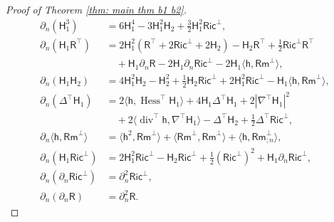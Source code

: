 \documentclass[11pt]{amsart}
\newcommand{\dvg}{\operatorname{div}}
\theoremstyle{definition}
\numberwithin{equation}{section}
\begin{document}
\begin{proof}[Proof of Theorem \ref{thm: main thm b1 b2}]
\begin{align*}
 \partial_n(\mathsf H_1^3)
 &=6\mathsf H_1^4-3\mathsf H_1^2\mathsf H_2
   +\frac32\mathsf H_1^2\mathsf{Ric}^\bot,\\[2mm]
 \partial_n(\mathsf H_1\mathsf R^\top)
 &=2\mathsf H_1^2(\mathsf R^\top+2\mathsf{Ric}^\bot+2\mathsf H_2)
   -\mathsf H_2\mathsf R^\top+\frac12\mathsf{Ric}^\bot\mathsf R^\top\\
 &\quad+\mathsf H_1\partial_n\mathsf R
   -2\mathsf H_1\partial_n\mathsf{Ric}^\bot
   -2\mathsf H_1\langle\mathsf h,\mathsf{Rm}^\bot\rangle,\\[2mm]
 \partial_n(\mathsf H_1\mathsf H_2)
 &=4\mathsf H_1^2\mathsf H_2-\mathsf H_2^2
   +\frac12\mathsf H_2\mathsf{Ric}^\bot
   +2\mathsf H_1^2\mathsf{Ric}^\bot
   -\mathsf H_1\langle\mathsf h,\mathsf{Rm}^\bot\rangle,\\[2mm]
 \partial_n(\mathsf\Delta^\top\mathsf H_1)
 &=2\langle\mathsf h,\operatorname{Hess}^\top\mathsf H_1\rangle
   +4\mathsf H_1\mathsf\Delta^\top\mathsf H_1
   +2|\nabla^\top\mathsf H_1|^2\\
 &\quad+2\langle\dvg^\top\mathsf h,\nabla^\top\mathsf H_1\rangle
   -\mathsf\Delta^\top\mathsf H_2
   +\frac12\mathsf\Delta^\top\mathsf{Ric}^\bot,\\[2mm]
 \partial_n\langle\mathsf h,\mathsf{Rm}^\bot\rangle
 &=\langle\mathsf h^2,\mathsf{Rm}^\bot\rangle
   +\langle\mathsf{Rm}^\bot,\mathsf{Rm}^\bot\rangle
   +\langle\mathsf h,\mathsf{Rm}_{;n}^\bot\rangle,\\[2mm]
 \partial_n(\mathsf H_1\mathsf{Ric}^\bot)
 &=2\mathsf H_1^2\mathsf{Ric}^\bot
   -\mathsf H_2\mathsf{Ric}^\bot
   +\frac12(\mathsf{Ric}^\bot)^2
   +\mathsf H_1\partial_n\mathsf{Ric}^\bot,\\[2mm]
 \partial_n(\partial_n\mathsf{Ric}^\bot)
 &=\partial_n^2\mathsf{Ric}^\bot,\\
 \partial_n(\partial_n\mathsf R)
 &=\partial_n^2\mathsf R.
\end{align*}


\end{proof}
\end{document}
